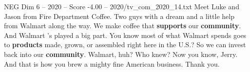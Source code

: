 \begin{textsample}{NEG Dim 6 – 2020 – Score -4.00 – 2020/tv\_com\_2020\_14.txt}  \label{ex:f6_neg_051}
Meet Luke and Jason from Fire Department Coffee.
Two guys with a dream and a little help from Walmart along the way.
We make coffee that \textbf{supports} our \textbf{community}.
And Walmart 's played a big part.
You know most of what Walmart spends goes to \textbf{products} made, grown, or assembled right here in the U.S.?
So we can invest back into our \textbf{community}.
Walmart, huh?
Who knew?
Now you know, Jerry.
And that is how you brew a mighty fine American business.
Thank you.

\end{textsample}
